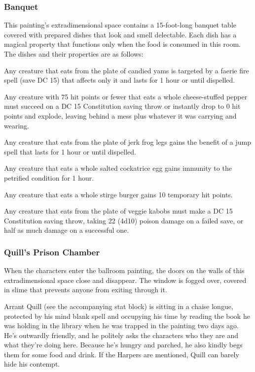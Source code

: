\documentclass[10pt,a4paper,twoside,bg=print,twocolumn,openany,nodeprecatedcode]{dndbook}
\begin{document}
\subsubsection{Banquet}
This painting's extradimensional space contains a 15-foot-long banquet table covered with prepared dishes that look and smell delectable. Each dish has a magical property that functions only when the food is consumed in this room. The dishes and their properties are as follows:


\begin{description}[nolistsep]
\item[Candied Yams]
Any creature that eats from the plate of candied yams is targeted by a faerie fire spell (save DC 15) that affects only it and lasts for 1 hour or until dispelled.
\item[Cheese-Stuffed Peppers]
Any creature with 75 hit points or fewer that eats a whole cheese-stuffed pepper must succeed on a DC 15 Constitution saving throw or instantly drop to 0 hit points and explode, leaving behind a mess plus whatever it was carrying and wearing.
\item[Jerk Frog Legs]
Any creature that eats from the plate of jerk frog legs gains the benefit of a jump spell that lasts for 1 hour or until dispelled.
\item[Salted Cockatrice Eggs]
Any creature that eats a whole salted cockatrice egg gains immunity to the petrified condition for 1 hour.
\item[Stirge Burgers]
Any creature that eats a whole stirge burger gains 10 temporary hit points.
\item[Veggie Kabobs]
Any creature that eats from the plate of veggie kabobs must make a DC 15 Constitution saving throw, taking 22 (4d10) poison damage on a failed save, or half as much damage on a successful one.
\end{description}

\subsubsection{Quill's Prison Chamber}
When the characters enter the ballroom painting, the doors on the walls of this extradimensional space close and disappear. The window is fogged over, covered in slime that prevents anyone from exiting through it.

Arrant Quill (see the accompanying stat block) is sitting in a chaise longue, protected by his mind blank spell and occupying his time by reading the book he was holding in the library when he was trapped in the painting two days ago. He's outwardly friendly, and he politely asks the characters who they are and what they're doing here. Because he's hungry and parched, he also kindly begs them for some food and drink. If the Harpers are mentioned, Quill can barely hide his contempt.
\end{document}
